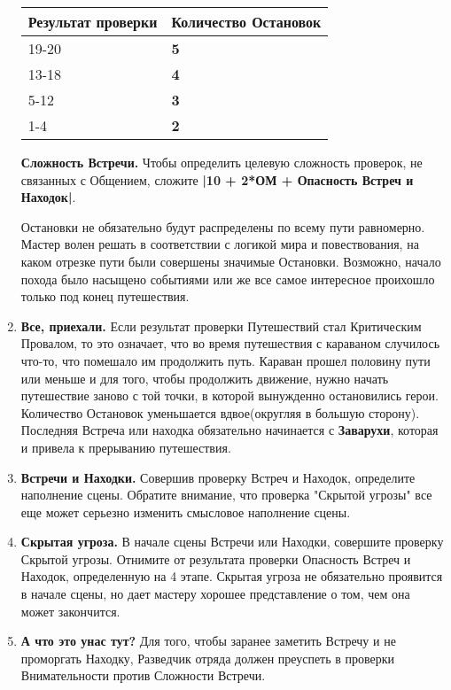 \begin{enumerate}
\begin{center}
\begin{tabular}{ |p{2.7cm}|p{12cm}| }
\hline
\textbf{Результат проверки} & \textbf{Количество Остановок}
\\ \hline
19-20 & \textbf{5}
\\ \hline
13-18 & \textbf{4}
\\ \hline
5-12 & \textbf{3}
\\ \hline
1-4 & \textbf{2}
\\ \hline
\end{tabular}
\end{center}
\textbf{Сложность Встречи.} Чтобы определить целевую сложность проверок, не связанных с Общением, сложите \textbf{|10 + 2*ОМ + Опасность Встреч и Находок|}.
\begin{tcolorbox}
Остановки не обязательно будут распределены по всему пути равномерно. Мастер волен решать в соответствии с логикой мира и повествования, на каком отрезке пути были совершены значимые Остановки. Возможно, начало похода было насыщено событиями или же все самое интересное проихошло только под конец путешествия.
\end{tcolorbox}
\item \textbf{Все, приехали.} Если результат проверки Путешествий стал Критическим Провалом, то это означает, что во время путешествия с караваном случилось что-то, что помешало им продолжить путь. Караван прошел половину пути или меньше и для того, чтобы продолжить движение, нужно начать путешествие заново с той точки, в которой вынужденно остановились герои.
\newline Количество Остановок уменьшается вдвое(округляя в большую сторону). Последняя Встреча или находка обязательно начинается с \textbf{Заварухи}, которая и привела к прерыванию путешествия.
\item \textbf{Встречи и Находки.} Совершив проверку Встреч и Находок, определите наполнение сцены. Обратите внимание, что проверка "Скрытой угрозы" все еще может серьезно изменить смысловое наполнение сцены.
\item \textbf{Скрытая угроза.} В начале сцены Встречи или Находки, совершите проверку Скрытой угрозы. Отнимите от результата проверки Опасность Встреч и Находок, определенную на 4 этапе. Скрытая угроза не обязательно проявится в начале сцены, но дает мастеру хорошее представление о том, чем она может закончится.
\item \textbf{А что это унас тут?} Для того, чтобы заранее заметить Встречу и не проморгать Находку, Разведчик отряда должен преуспеть в проверки Внимательности против Сложности Встречи.

\end{enumerate}
